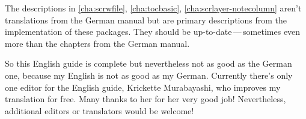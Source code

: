 The descriptions in \autoref{cha:scrwfile}, \autoref{cha:tocbasic},
\autoref{cha:scrlayer-notecolumn} aren't translations from the German manual
but are primary descriptions from the implementation of these packages. They
should be up-to-date\,---\,sometimes even more than the chapters from the
German manual.

So this English guide is complete but nevertheless not as good as the German
one, because my English is not as good as my German. Currently there's only
one editor for the English guide, Krickette Murabayashi, who improves my
translation for free. Many thanks to her for her very good job! Nevertheless,
additional editors or translators would be welcome!

\endinput


